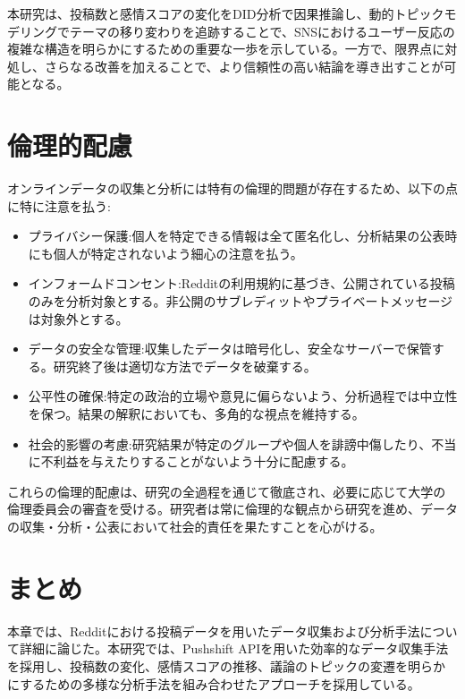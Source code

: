 \documentclass[11pt, a4j]{jreport}
\begin{document}
    本研究は、投稿数と感情スコアの変化をDID分析で因果推論し、動的トピックモデリングでテーマの移り変わりを追跡することで、SNSにおけるユーザー反応の複雑な構造を明らかにするための重要な一歩を示している。一方で、限界点に対処し、さらなる改善を加えることで、より信頼性の高い結論を導き出すことが可能となる。

    \section{倫理的配慮}
    オンラインデータの収集と分析には特有の倫理的問題が存在するため、以下の点に特に注意を払う:

    \begin{itemize}
        \item プライバシー保護:個人を特定できる情報は全て匿名化し、分析結果の公表時にも個人が特定されないよう細心の注意を払う。

        \item インフォームドコンセント:Redditの利用規約に基づき、公開されている投稿のみを分析対象とする。非公開のサブレディットやプライベートメッセージは対象外とする。

        \item データの安全な管理:収集したデータは暗号化し、安全なサーバーで保管する。研究終了後は適切な方法でデータを破棄する。

        \item 公平性の確保:特定の政治的立場や意見に偏らないよう、分析過程では中立性を保つ。結果の解釈においても、多角的な視点を維持する。

        \item 社会的影響の考慮:研究結果が特定のグループや個人を誹謗中傷したり、不当に不利益を与えたりすることがないよう十分に配慮する。
    \end{itemize}

    これらの倫理的配慮は、研究の全過程を通じて徹底され、必要に応じて大学の倫理委員会の審査を受ける。研究者は常に倫理的な観点から研究を進め、データの収集・分析・公表において社会的責任を果たすことを心がける。

    \section{まとめ}
    本章では、Redditにおける投稿データを用いたデータ収集および分析手法について詳細に論じた。本研究では、Pushshift APIを用いた効率的なデータ収集手法を採用し、投稿数の変化、感情スコアの推移、議論のトピックの変遷を明らかにするための多様な分析手法を組み合わせたアプローチを採用している。
\end{document}

